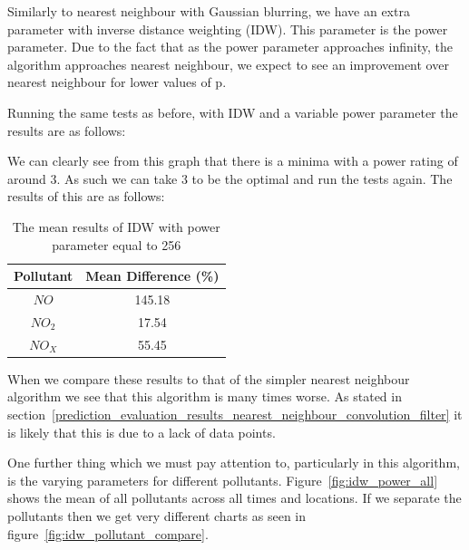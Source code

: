 
        	Similarly to nearest neighbour with Gaussian blurring, we have an extra parameter with inverse distance weighting (IDW). This parameter is the power parameter. Due to the fact that as the power parameter approaches infinity, the algorithm approaches nearest neighbour, we expect to see an improvement over nearest neighbour for lower values of p.

        	Running the same tests as before, with IDW and a variable power parameter the results are as follows:


        	We can clearly see from this graph that there is a minima with a power rating of around 3. As such we can take 3 to be the optimal and run the tests again. The results of this are as follows:

        	\begin{table}[H]
				\centering
	    		\begin{tabular}{|c|c|}
	    			\hline
					Pollutant & Mean Difference (\%) \\ \hline
					$NO$ & 145.18 \\
					$NO_{2}$ & 17.54 \\
					$NO_{X}$ & 55.45 \\
					\hline
				\end{tabular}
				\caption{The mean results of IDW with power parameter equal to 256}
				\label{tab:idw_results}
			\end{table}

			When we compare these results to that of the simpler nearest neighbour algorithm we see that this algorithm is many times worse. As stated in section~\ref{prediction_evaluation_results_nearest_neighbour_convolution_filter} it is likely that this is due to a lack of data points. 

			One further thing which we must pay attention to, particularly in this algorithm, is the varying parameters for different pollutants. Figure~\ref{fig:idw_power_all} shows the mean of all pollutants across all times and locations. If we separate the pollutants then we get very different charts as seen in figure~\ref{fig:idw_pollutant_compare}.

